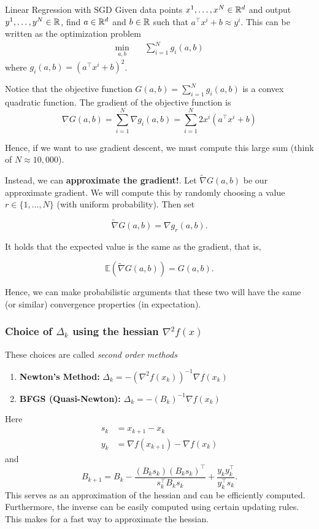 \documentclass[../open-optimization/open-optimization.tex]{subfiles}
\begin{document}
\begin{example}{Linear Regression with SGD}{}
Given data points $x^1, \dots, x^N \in {\mathbb{R}}^d$ and output $y^1, \dots, y^N \in {\mathbb{R}}$, find $a \in {\mathbb{R}}^d$ and $b \in {\mathbb{R}}$ such that $a^\top x^i + b \approx y^i$.   This can be written as the optimization problem 
\begin{equation}
\begin{array}{rl}
\min_{a,b} \quad & \sum_{i=1}^N g_i(a,b)
\end{array}
\end{equation}
where $g_i(a,b) = (a^\top x^i + b)^2$.   

Notice that the objective function $G(a,b) = \sum_{i=1}^N g_i(a,b)$  is a convex quadratic function.  The gradient of the objective function is 
$$
\nabla G(a,b) = \sum_{i=1}^N \nabla g_i(a,b) = \sum_{i=1}^N 2x^i (a^\top x^i + b)
$$

Hence, if we want to use gradient descent, we must compute this large sum (think of $N \approx 10,000$).  

Instead, we can \textbf{approximate the gradient!}.  Let $\tilde \nabla G(a,b)$ be our approximate gradient.  We will compute this by randomly choosing a value $r \in \{1, \dots, N\}$ (with uniform probability).  Then set

$$
\tilde \nabla G(a,b) = \nabla g_r(a,b).
$$

It holds that the expected value is the same as the gradient, that is,

$$
\mathbb{E}(\tilde \nabla G(a,b)) = G(a,b).
$$


Hence, we can make probabilistic arguments that these two will have the same (or similar) convergence properties (in expectation).
\end{example}



\subsubsection{Choice of $\Delta_k$ using the hessian $\nabla^2 f(x)$}
These choices are called \emph{second order methods}
\begin{enumerate}
\item \textbf{Newton's Method:}   $\Delta_k = - (\nabla^2f(x_k))^{-1} \nabla f(x_k)$
\item \textbf{BFGS (Quasi-Newton):} $\Delta_k = - (B_k)^{-1} \nabla f(x_k)$
\end{enumerate}
Here
\begin{align*}
s_k &= x_{k+1} - x_k\\
y_k &= \nabla f(x_{k+1}) - \nabla f(x_k)
\end{align*}
and
$$
B_{k+1} = B_k - \frac{(B_k s_k)(B_k s_k)^\top}{s_k^\top B_k s_k} + \frac{y_k y_k^\top}{y_k^\top s_k}.
$$
This serves as an approximation of the hessian and can be efficiently computed.  Furthermore,  the inverse can be easily computed using certain updating rules.  This makes for a fast way to approximate the hessian.
\end{document}

